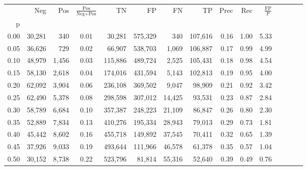 \begin{tabular}{rrrcrrrrrrrrrrr}
\toprule
{} &     Neg &    Pos & $\frac{\text{Pos}}{\text{Neg}+\text{Pos}}$ &       TN &       FP &       FN &       TP &  Prec &   Rec & $\frac{\text{FP}}{\text{P}}$ \\
p    &         &        &                                            &          &          &          &          &       &       &                              \\
\midrule
0.00 &  30,281 &    340 &                                       0.01 &   30,281 &  575,329 &      340 &  107,616 &  0.16 &  1.00 &                         5.33 \\
0.05 &  36,626 &    729 &                                       0.02 &   66,907 &  538,703 &    1,069 &  106,887 &  0.17 &  0.99 &                         4.99 \\
0.10 &  48,979 &  1,456 &                                       0.03 &  115,886 &  489,724 &    2,525 &  105,431 &  0.18 &  0.98 &                         4.54 \\
0.15 &  58,130 &  2,618 &                                       0.04 &  174,016 &  431,594 &    5,143 &  102,813 &  0.19 &  0.95 &                         4.00 \\
0.20 &  62,092 &  3,904 &                                       0.06 &  236,108 &  369,502 &    9,047 &   98,909 &  0.21 &  0.92 &                         3.42 \\
0.25 &  62,490 &  5,378 &                                       0.08 &  298,598 &  307,012 &   14,425 &   93,531 &  0.23 &  0.87 &                         2.84 \\
0.30 &  58,789 &  6,684 &                                       0.10 &  357,387 &  248,223 &   21,109 &   86,847 &  0.26 &  0.80 &                         2.30 \\
0.35 &  52,889 &  7,834 &                                       0.13 &  410,276 &  195,334 &   28,943 &   79,013 &  0.29 &  0.73 &                         1.81 \\
0.40 &  45,442 &  8,602 &                                       0.16 &  455,718 &  149,892 &   37,545 &   70,411 &  0.32 &  0.65 &                         1.39 \\
0.45 &  37,926 &  9,033 &                                       0.19 &  493,644 &  111,966 &   46,578 &   61,378 &  0.35 &  0.57 &                         1.04 \\
0.50 &  30,152 &  8,738 &                                       0.22 &  523,796 &   81,814 &   55,316 &   52,640 &  0.39 &  0.49 &                         0.76 \\

\end{tabular}
